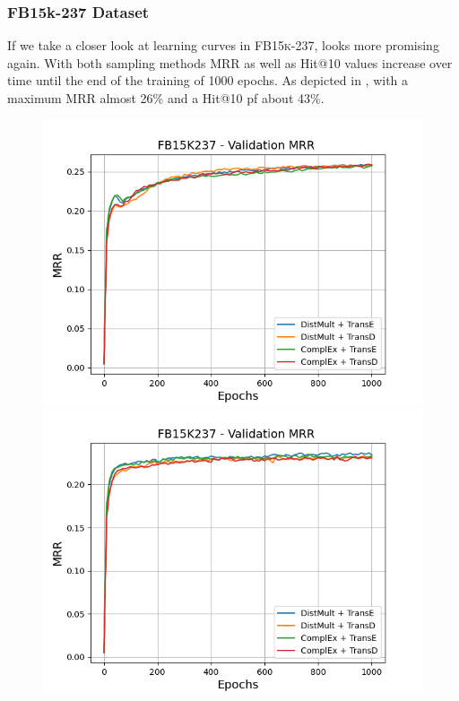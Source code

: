 \subsubsection{FB15k-237 Dataset}
\label{subsubsec:uncertainty_fb15k237}
%
If we take a closer look at learning curves in \textsc{FB15k-237}, \ussoftmax looks more promising again.
With both sampling methods MRR as well as Hit@10 values increase over time until the end of the training of 1000 epochs.
As depicted in , with \origssampling a maximum MRR almost 26\% and a Hit@10 pf about 43\%.
\begin{figure}
    \centering
    \begin{minipage}{.5\textwidth}
      \centering
      \includegraphics[width=0.9\linewidth]{figures/results/gan_train/not_pretrained/random/fb15k237/epochs1000/random_fb15k237_mrrs.png}
    \end{minipage}%
    \begin{minipage}{.5\textwidth}
      \centering
      \includegraphics[width=0.9\linewidth]{figures/results/gan_train/not_pretrained/uncertainty/max_distribution/entropy/fb15k237/1k_epochs/uncertainty_fb15k237_mrrs.png}

\end{minipage}
\end{figure}
